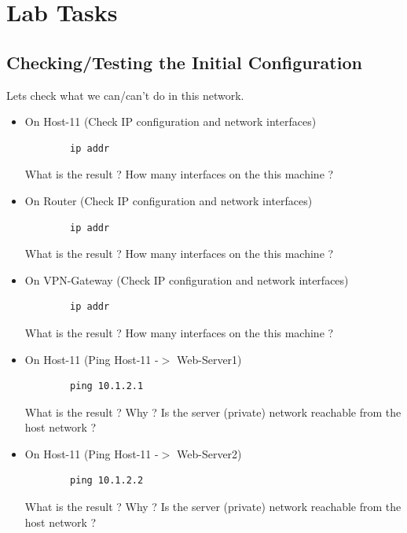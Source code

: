 \section{Lab Tasks}

\subsection{Checking/Testing the Initial Configuration}\label{Checking/Testing the Initial Configuration}
Lets check what we can/can't do in this network.
\newline
\begin{itemize}
	\item On Host-11 (Check IP configuration and network interfaces)
	\begin{verbatim}
	    ip addr
	\end{verbatim}

	What is the result ? How many interfaces on the this machine ?

	\item On Router (Check IP configuration and network interfaces)
	\begin{verbatim}
	    ip addr
	\end{verbatim}

	What is the result ? How many interfaces on the this machine ?

	\item On VPN-Gateway (Check IP configuration and network interfaces)
	\begin{verbatim}
	    ip addr
	\end{verbatim}

	What is the result ? How many interfaces on the this machine ?

	\item On Host-11 (Ping Host-11 -$>$ Web-Server1)
	\begin{verbatim}
	    ping 10.1.2.1
	\end{verbatim}

	What is the result ? Why ? Is the server (private) network reachable from the host network ?

	\item On Host-11 (Ping Host-11 -$>$ Web-Server2)
	\begin{verbatim}
	    ping 10.1.2.2
	\end{verbatim}

	What is the result ? Why ? Is the server (private) network reachable from the host network ?

\end{itemize}

